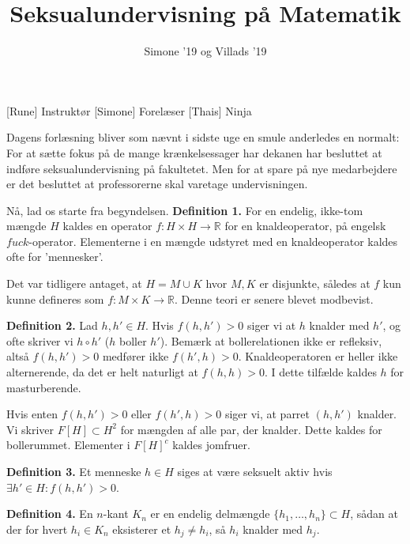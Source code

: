 \documentclass[a4paper,11pt]{article}
\title{Seksualundervisning på Matematik}
\author{Simone ’19 og Villads ’19}
\begin{document}
\maketitle

\begin{roles}
[Rune] Instruktør
[Simone] Forelæser
[Thais] Ninja
\end{roles}

\begin{props}
\end{props}


\begin{sketch}
 Dagens forlæsning bliver som nævnt i sidste uge en smule anderledes en normalt: For at sætte fokus på de mange krænkelsessager har dekanen har besluttet at indføre seksualundervisning på fakultetet. Men for at spare på nye medarbejdere er det besluttet at professorerne skal varetage undervisningen.

 Nå, lad os starte fra begyndelsen. \textbf{Definition 1.} For en endelig, ikke-tom mængde $H$ kaldes en operator $f\colon H \times H \to \mathbb{R}$ for en knaldeoperator, på engelsk $fuck$-operator. Elementerne i en mængde udstyret med en knaldeoperator kaldes ofte for ’mennesker’.

 Det var tidligere antaget, at $H = M \cup K$ hvor $M, K$ er disjunkte,
således at $f$ kun kunne defineres som $f\colon M \times K \to \mathbb{R}$. Denne teori er senere blevet modbevist.

 \textbf{Definition 2.} Lad $h, h' \in H$. Hvis $f(h, h') > 0$ siger vi at $h$ knalder med $h'$, og ofte skriver vi $h \circ h'$ ($h$ boller $h'$). Bemærk at bollerelationen ikke er refleksiv, altså $f(h, h') > 0$ medfører ikke $f(h', h) > 0$. Knaldeoperatoren er heller ikke alternerende, da det er helt naturligt at $f(h, h) > 0$. I dette tilfælde kaldes $h$ for masturberende.

 Hvis enten $f(h, h') > 0$ eller $f(h', h) > 0$ siger vi, at parret $(h, h')$ knalder. Vi skriver $F[H] \subset H^2$ for mængden af alle par, der knalder. Dette kaldes for bollerummet. Elementer i $F[H]^c$ kaldes jomfruer.

 \textbf{Definition 3.} Et menneske $h \in H$ siges at være seksuelt aktiv hvis $\exists h' \in H\colon f(h, h') > 0$.

 \textbf{Definition 4.} En $n$-kant $K_n$ er en endelig delmængde $\{h_1, \ldots, h_n\} \subset H$, sådan at der for hvert $h_i \in K_n$ eksisterer et $h_j \neq h_i$, så $h_i$ knalder med $h_j$.


\end{sketch}
\end{document}
